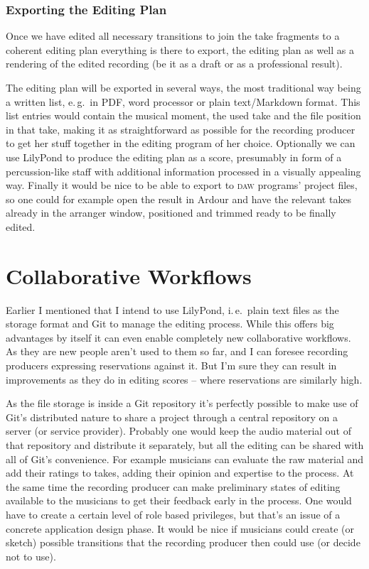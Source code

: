 \documentclass[11pt,a4paper]{article}
\begin{document}
\subsubsection{Exporting the Editing Plan}

Once we have edited all necessary transitions to join the take fragments to a
coherent editing plan everything is there to export, the editing plan as well as
a rendering of the edited recording (be it as a draft or as a professional
result).

The editing plan will be exported in several ways, the most traditional way
being a written list, e.\,g.\ in PDF, word processor or plain text/Markdown
format.
This list entries would contain the musical moment, the used take and the file
position in that take, making it as straightforward as possible for the
recording producer to get her stuff together in the editing program of her
choice.
Optionally we can use LilyPond to produce the editing plan as a score,
presumably in form of a percussion-like staff with additional information
processed in a visually appealing way.
Finally it would be nice to be able to export to \textsc{daw} programs' project
files, so one could for example open the result in Ardour and have the relevant
takes already in the arranger window, positioned and trimmed ready to be finally
edited.

\section{Collaborative Workflows}

Earlier I mentioned that I intend to use LilyPond, i.\,e.\ plain text files as
the storage format and Git to manage the editing process.
While this offers big advantages by itself it can even enable completely new
collaborative workflows.
As they are new people aren't used to them so far, and I can foresee recording
producers expressing reservations against it.
But I'm sure they can result in improvements as they do in editing scores -- where
reservations are similarly high.

As the file storage is inside a Git repository it's perfectly possible to make
use of Git's distributed nature to share a project through a central repository
on a server (or service provider).
Probably one would keep the audio material out of that repository and distribute
it separately, but all the editing can be shared with all of Git's convenience.
For example musicians can evaluate the raw material and add their ratings to
takes, adding their opinion and expertise to the process.
At the same time the recording producer can make preliminary states of editing
available to the musicians to get their feedback early in the process.
One would have to create a certain level of role based privileges, but that's an
issue of a concrete application design phase.
It would be nice if musicians could create (or sketch) possible transitions that
the recording producer then could use (or decide not to use).
\end{document}
